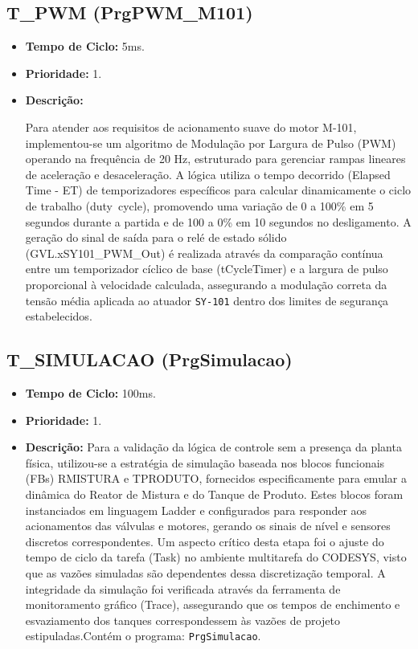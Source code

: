 \subsection{T\_PWM (PrgPWM\_M101)}
\begin{itemize}
    \item \textbf{Tempo de Ciclo:} 5ms.
    \item \textbf{Prioridade:} 1.
    \item \textbf{Descrição:}

Para atender aos requisitos de acionamento suave do motor M-101, implementou-se um algoritmo de Modulação por Largura de Pulso (PWM) operando na frequência de 20 Hz, estruturado para gerenciar rampas lineares de aceleração e desaceleração. A lógica utiliza o tempo decorrido (Elapsed Time - ET) de temporizadores específicos para calcular dinamicamente o ciclo de trabalho (duty\ cycle), promovendo uma variação de 0 a 100\% em 5 segundos durante a partida e de 100 a 0\% em 10 segundos no desligamento. A geração do sinal de saída para o relé de estado sólido (GVL.xSY101\_PWM\_Out) é realizada através da comparação contínua entre um temporizador cíclico de base (tCycleTimer) e a largura de pulso proporcional à velocidade calculada, assegurando a modulação correta da tensão média aplicada ao atuador \texttt{SY-101} dentro dos limites de segurança estabelecidos.
\end{itemize}



\subsection{T\_SIMULACAO (PrgSimulacao)}
\begin{itemize}
    \item \textbf{Tempo de Ciclo:} 100ms.
    \item \textbf{Prioridade:} 1.
    \item \textbf{Descrição:}
Para a validação da lógica de controle sem a presença da planta física, utilizou-se a estratégia de simulação baseada nos blocos funcionais (FBs) RMISTURA e TPRODUTO, fornecidos especificamente para emular a dinâmica do Reator de Mistura e do Tanque de Produto. Estes blocos foram instanciados em linguagem Ladder e configurados para responder aos acionamentos das válvulas e motores, gerando os sinais de nível e sensores discretos correspondentes. Um aspecto crítico desta etapa foi o ajuste do tempo de ciclo da tarefa (Task) no ambiente multitarefa do CODESYS, visto que as vazões simuladas são dependentes dessa discretização temporal. A integridade da simulação foi verificada através da ferramenta de monitoramento gráfico (Trace), assegurando que os tempos de enchimento e esvaziamento dos tanques correspondessem às vazões de projeto estipuladas.Contém o programa: \texttt{PrgSimulacao}.
\end{itemize}